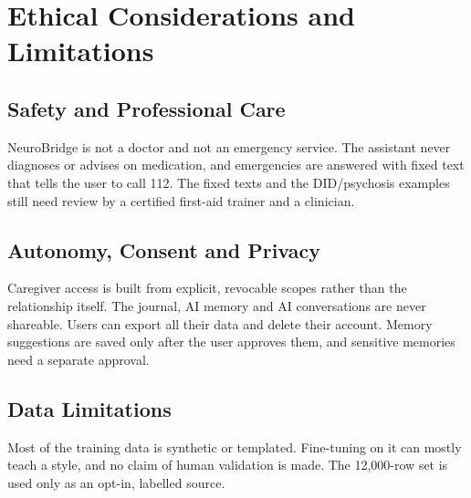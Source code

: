 \documentclass[11pt,a4paper]{article}
\begin{document}
\section{Ethical Considerations and Limitations}\label{sec:ethics}

\subsection{Safety and Professional Care}
NeuroBridge is not a doctor and not an emergency service. The assistant never diagnoses or advises on
medication, and emergencies are answered with fixed text that tells the user to call 112. The fixed
texts and the DID/psychosis examples still need review by a certified first-aid trainer and a clinician.

\subsection{Autonomy, Consent and Privacy}
Caregiver access is built from explicit, revocable scopes rather than the relationship itself. The
journal, AI memory and AI conversations are never shareable. Users can export all their data and delete
their account. Memory suggestions are saved only after the user approves them, and sensitive memories
need a separate approval.

\subsection{Data Limitations}
Most of the training data is synthetic or templated. Fine-tuning on it can mostly teach a style, and no
claim of human validation is made. The 12,000-row set is used only as an opt-in, labelled source.
\end{document}
